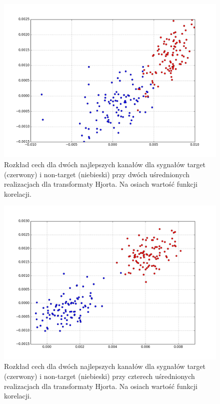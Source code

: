 \documentclass[licencjacka,openright]{pracamgr}
\begin{document}
\begin{figure}
\centering
\includegraphics[scale=0.55, trim=10mm 15mm 10mm 18mm, clip=True]{pics/cecha_hjorth_2.png}
\caption{Rozkład cech dla dwóch najlepszych kanałów dla sygnałów target (czerwony) i non-target (niebieski) przy dwóch uśrednionych realizacjach dla transformaty Hjorta. Na osiach wartość funkcji korelacji.}
\label{cecha_hjorth_2}
\end{figure}

\begin{figure}
\centering
\includegraphics[scale=0.55, trim=10mm 15mm 10mm 18mm, clip=True]{pics/cecha_hjorth_4.png}
\caption{Rozkład cech dla dwóch najlepszych kanałów dla sygnałów target (czerwony) i non-target (niebieski) przy czterech uśrednionych realizacjach dla transformaty Hjorta. Na osiach wartość funkcji korelacji.}
\label{cecha_hjorth_4}
\end{figure}
\end{document}
